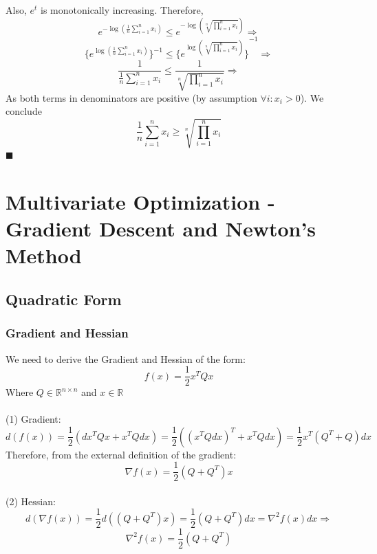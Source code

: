 \documentclass{article}
\newcommand{\qed}{\hfill$\blacksquare$}
\begin{document}
Also, $e^t$ is monotonically increasing. Therefore,
$$e^{-\log(\frac{1}{n} \sum_{i=1}^n x_i)} \leq e^{-\log(\sqrt[n]{\prod_{i=1}^n x_i})} \Rightarrow$$
$$\{e^{\log{(\frac{1}{n} \sum_{i=1}^n x_i)}}\}^{-1} \leq {\{e^{\log(\sqrt[n]{\prod_{i=1}^n x_i})}\}}^{-1} \Rightarrow$$
$$\frac{1}{\frac{1}{n} \sum_{i=1}^n x_i} \leq \frac{1}{\sqrt[n]{\prod_{i=1}^n x_i}}\Rightarrow$$
As both terms in denominators are positive (by assumption $\forall i : x_i > 0$). We conclude\\
$$\frac{1}{n} \sum_{i=1}^n x_i \geq \sqrt[n]{\prod_{i=1}^n x_i}$$
\qed

\newpage

\section{Multivariate Optimization - Gradient Descent
and Newton’s Method}

\subsection{Quadratic Form}

\subsubsection{Gradient and Hessian}
We need to derive the Gradient and Hessian of the form:
$$f(x)=\frac{1}{2} x^T Q x$$
Where $Q \in \mathbb{R}^{n \times n}$ and $x \in \mathbb{R}$\\
\\
(1) Gradient: $$d(f(x)) = \frac{1}{2}(dx^T Q x + x^T Q dx) = \frac{1}{2}((x^T Q dx)^T + x^T Q dx) = \frac{1}{2} x^T (Q^T + Q) dx$$
Therefore, from the external definition of the gradient:
$$\nabla f(x) = \frac{1}{2} (Q + Q^T)x$$
\\
(2) Hessian:\\
$$d(\nabla f(x)) =  \frac{1}{2} d((Q + Q^T)x) = \frac{1}{2} (Q + Q^T)dx = \nabla^2 f(x) dx \Rightarrow$$
$$\nabla^2 f(x) = \frac{1}{2} (Q + Q^T)$$
\end{document}
